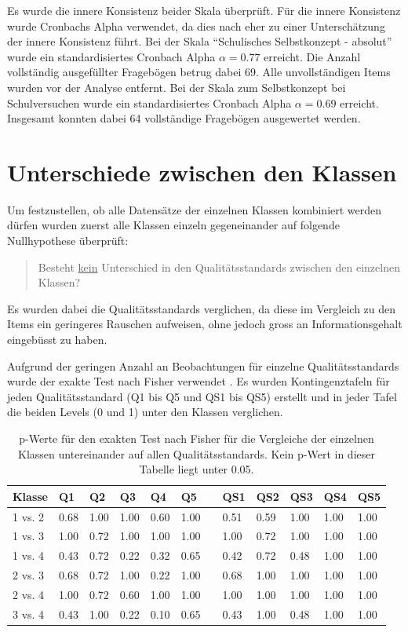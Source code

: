 \label{txt:Cronbach}
Es wurde die innere Konsistenz beider Skala überprüft. Für die innere Konsistenz wurde Cronbachs Alpha verwendet, da dies nach \citet{Eisinga2013} eher zu einer Unterschätzung der innere Konsistenz führt. Bei der Skala "`Schulisches Selbstkonzept - absolut"' wurde ein standardisiertes Cronbach Alpha $\alpha=0.77$  erreicht. Die Anzahl vollständig ausgefüllter Fragebögen betrug dabei 69. Alle unvollständigen Items wurden vor der Analyse entfernt. Bei der Skala zum Selbstkonzept bei Schulversuchen wurde ein standardisiertes Cronbach Alpha $\alpha = 0.69$ erreicht. Insgesamt konnten dabei 64 vollständige Fragebögen ausgewertet werden. 


\section{Unterschiede zwischen den Klassen}

Um festzustellen, ob alle Datensätze der einzelnen Klassen kombiniert werden dürfen wurden zuerst alle Klassen einzeln gegeneinander auf folgende Nullhypothese überprüft: 
\begin{quote}
Besteht \underline{kein} Unterschied in den Qualitätsstandards zwischen den einzelnen Klassen?
\end{quote}
Es wurden dabei die Qualitätsstandards verglichen, da diese im Vergleich zu den Items ein geringeres Rauschen aufweisen, ohne jedoch gross an Informationsgehalt eingebüsst zu haben.


Aufgrund der geringen Anzahl an Beobachtungen für einzelne Qualitätsstandards wurde der exakte Test nach Fisher verwendet \citep{Fisher1922}. Es wurden Kontingenztafeln für jeden Qualitätsstandard (Q1 bis Q5 und QS1 bis QS5) erstellt und in jeder Tafel die beiden Levels (0 und 1) unter den Klassen verglichen.


\begin{table}[htbp]
  \centering
\begin{tabular}{@{}llllllllllll@{}}
\toprule
 Klasse & Q1 & Q2 & Q3 & Q4 & Q5 && QS1 & QS2 & QS3 & QS4 & QS5 \\ 
\midrule
 1 vs. 2 &   0.68 & 1.00 & 1.00 & 0.60 & 1.00 && 0.51 & 0.59 & 1.00 & 1.00 & 1.00   \\ 
 1 vs. 3 &   1.00 & 0.72 & 1.00 & 1.00 & 1.00 && 1.00 & 0.72 & 1.00 & 1.00 & 1.00   \\
 1 vs. 4 &   0.43 & 0.72 & 0.22 & 0.32 & 0.65 && 0.42 & 0.72 & 0.48 & 1.00 & 1.00   \\
 2 vs. 3 &   0.68 & 0.72 & 1.00 & 0.22 & 1.00 && 0.68 & 1.00 & 1.00 & 1.00 & 1.00   \\
 2 vs. 4 &   1.00 & 0.72 & 0.60 & 1.00 & 1.00 && 1.00 & 1.00 & 1.00 & 1.00 & 1.00   \\
 3 vs. 4 &   0.43 & 1.00 & 0.22 & 0.10 & 0.65 && 0.43 & 1.00 & 0.48 & 1.00 & 1.00   \\
\bottomrule
\end{tabular} 
  \caption{p-Werte für den exakten Test nach Fisher für die Vergleiche der einzelnen Klassen untereinander auf allen Qualitätsstandards. Kein p-Wert in dieser Tabelle liegt unter 0.05. }
  \label{tab:KlassenVergleiche}
\end{table}


